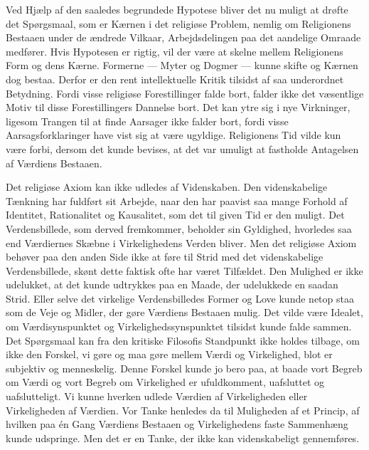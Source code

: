 \documentclass[12pt,a4paper]{article}
\newcommand{\opage}[1]{\marginnote{\footnotesize\textit{[#1]}}}
\begin{document}
Ved Hjælp af den saaledes begrundede Hypotese bliver det nu muligt at drøfte
det Spørgsmaal, som er Kærnen i det religiøse Problem, nemlig om Religionens
Bestaaen under de ændrede Vilkaar, Arbejdsdelingen paa det aandelige Omraade
medfører. Hvis Hypotesen er rigtig, vil der være at skelne mellem Religionens
Form og dens Kærne. Formerne --- Myter og Dogmer --- kunne skifte og Kærnen dog
bestaa. Derfor er den rent intellektuelle Kritik tilsidst af saa underordnet
Betydning. Fordi visse religiøse Forestillinger falde bort, falder ikke det
væsentlige Motiv til disse Forestillingers Dannelse bort. Det kan ytre sig i
nye Virkninger, ligesom Trangen til at finde Aarsager ikke falder bort, fordi
visse Aarsagsforklaringer have vist sig at være ugyldige. Religionens Tid vilde
kun være forbi, dersom det kunde bevises, at det var umuligt at fastholde
Antagelsen af Værdiens Bestaaen.

Det religiøse Axiom kan ikke udledes af Videnskaben. Den videnskabelige
Tænkning har fuldført sit Arbejde, naar den har paavist saa mange Forhold af
Identitet, Rationalitet og Kausalitet, som det til given Tid er den muligt. Det
Verdensbillede, som derved fremkommer, beholder sin Gyldighed, hvorledes saa
end Værdiernes Skæbne i Virkelighedens Verden bliver. Men det religiøse Axiom
behøver paa den anden Side ikke at føre til Strid med det videnskabelige
Verdensbillede, skønt dette faktisk ofte har været Tilfældet. Den Mulighed er
ikke udelukket, at det kunde udtrykkes paa en Maade, der udelukkede en saadan
Strid. Eller selve det virkelige Verdensbilledes Former og Love kunde netop
staa som de Veje og Midler, der gøre Værdiens Bestaaen mulig. Det vilde være
Idealet, om Værdisynspunktet og Virkelighedssynspunktet tilsidst kunde falde
sammen. Det Spørgsmaal kan fra den kritiske Filosofis Standpunkt ikke holdes
tilbage, om ikke den Forskel, vi gøre og maa gøre mellem Værdi og Virkelighed,
blot er subjektiv og menneskelig. Denne
\opage{419} Forskel kunde jo bero paa, at baade vort Begreb om Værdi og vort Begreb om
Virkelighed er ufuldkomment, uafsluttet og uafslutteligt. Vi kunne hverken
udlede Værdien af Virkeligheden eller Virkeligheden af Værdien. Vor Tanke
henledes da til Muligheden af et Princip, af hvilken paa én Gang Værdiens
Bestaaen og Virkelighedens faste Sammenhæng kunde udspringe. Men det er en
Tanke, der ikke kan videnskabeligt gennemføres.
\end{document}

